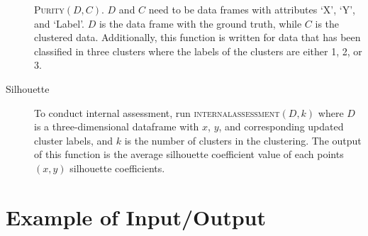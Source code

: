 \documentclass[psamsfonts,onesided,10pt]{amsart}
\begin{document}
\begin{description}
\textsc{Purity}$(D, C)$. $D$ and $C$ need to be data frames with 
attributes `X',  `Y', and `Label'. $D$ is the data frame with the ground truth, while $C$ is the 
clustered data. Additionally, this function is written for data that has been 
classified in three clusters where the labels of the clusters are either 1, 2, or 3. 
\item[Silhouette] To conduct internal assessment, run \textsc{internalassessment}$(D,k)$ 
where $D$ is a three-dimensional dataframe with $x$, $y$, and corresponding updated cluster 
labels, and $k$ is the number of clusters in the clustering. The output of this function is the 
average silhouette coefficient value of each points $(x,y)$ silhouette coefficients. 
\end{description}
 
\section{Example of Input/Output}
\end{document}
